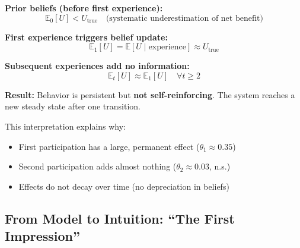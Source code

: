 \begin{tcolorbox}[colback=blue!5!white, colframe=blue!75!black,
    title=Cognitive Interpretation: One-Shot Belief Revision]

\textbf{Prior beliefs (before first experience):}
\begin{equation}
\mathbb{E}_0[U] < U_{\text{true}} \quad \text{(systematic underestimation of net benefit)}
\end{equation}

\textbf{First experience triggers belief update:}
\begin{equation}
\mathbb{E}_1[U] = \mathbb{E}[U \mid \text{experience}] \approx U_{\text{true}}
\end{equation}

\textbf{Subsequent experiences add no information:}
\begin{equation}
\mathbb{E}_t[U] \approx \mathbb{E}_1[U] \quad \forall t \geq 2
\end{equation}

\textbf{Result:} Behavior is persistent but \textbf{not self-reinforcing}.
The system reaches a new steady state after one transition.

\end{tcolorbox}

This interpretation explains why:
\begin{itemize}
\item First participation has a large, permanent effect ($\theta_1 \approx 0.35$)
\item Second participation adds almost nothing ($\theta_2 \approx 0.03$, n.s.)
\item Effects do not decay over time (no depreciation in beliefs)
\end{itemize}

\subsection{From Model to Intuition: ``The First Impression''}

